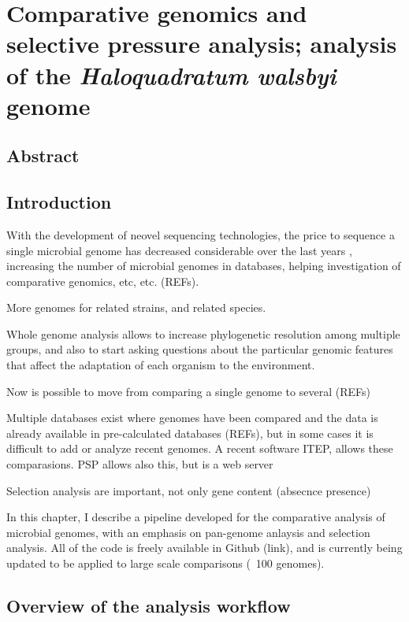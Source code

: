 \chapter{Comparative genomics and selective pressure analysis; analysis of the \textit{Haloquadratum walsbyi} genome}

\section{Abstract}

\section{Introduction}

With the development of neovel sequencing technologies, the price to sequence a single microbial genome has decreased considerable over the last years \cite{Mardis:2013gn}, increasing the number of microbial genomes in databases, helping investigation of comparative genomics, etc, etc. (REFs). 

More genomes for related strains, and related species.

Whole genome analysis allows to increase phylogenetic resolution among multiple groups, and also to start asking questions about the particular genomic features that affect the adaptation of each organism to the environment.

Now is possible to move from comparing a single genome to several (REFs)

Multiple databases exist where genomes have been compared and the data is already available in pre-calculated databases (REFs), but in some cases it is difficult to add or analyze recent genomes. A recent software ITEP, allows these comparasions. PSP allows also this, but is a web server

Selection analysis are important, not only gene content (absecnce presence)

In this chapter, I describe a pipeline developed for the comparative analysis of microbial genomes, with an emphasis on pan-genome anlaysis and selection analysis. All of the code is freely available in Github (link), and is currently being updated to be applied to large scale comparisons (~100 genomes). 

\section{Overview of the analysis workflow}

